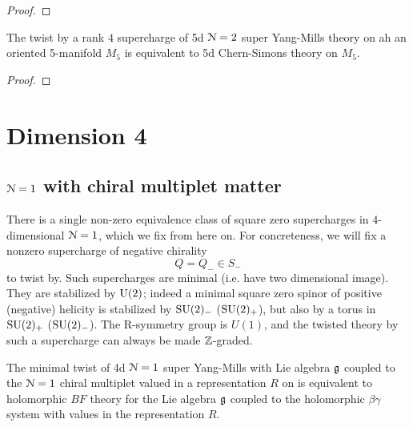 \documentclass[10pt, oneside]{article}
\begin{document}
\begin{proof}
 
\end{proof}


\begin{theorem} \label{5d_rk4_twist_thm}
The twist by a rank $4$ supercharge of 5d $\mathcal{N}=2$ super Yang-Mills theory on ah an oriented 5-manifold $M_5$ is equivalent to 5d Chern-Simons theory on $M_5$.
\end{theorem}

\begin{proof}
 
\end{proof}
 
\section{Dimension 4}


\subsection{$\mathcal N=1$ with chiral multiplet matter}
There is a single non-zero equivalence class of square zero supercharges in $4$-dimensional $\mathcal{N} = 1$, which we fix from here on.
For concreteness, we will fix a nonzero supercharge of negative chirality $$Q = Q_- \in S_-$$ to twist by. 
Such supercharges are minimal (i.e. have two dimensional image).  
They are stabilized by ${\rm U}(2)$; indeed a minimal square zero spinor of positive (negative) helicity is stabilized by $\mathrm{SU}(2)_-$ ($\mathrm{SU}(2)_+$), but also by a torus in $\mathrm{SU}(2)_+$ ($\mathrm{SU}(2)_-$).  
The R-symmetry group is $U(1)$, and the twisted theory by such a supercharge can always be made $\mathbb Z$-graded.

\begin{prop}
The minimal twist of 4d $\mathcal N=1$ super Yang-Mills with Lie algebra $\mathfrak g$ coupled to the $\mathcal N=1$ chiral multiplet valued in a representation $R$ on  is equivalent to holomorphic $BF$ theory for the Lie algebra $\mathfrak g$ coupled to the holomorphic $\beta\gamma$ system with values in the representation $R$. 
\end{prop}
\end{document}
